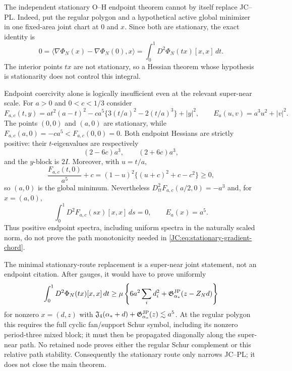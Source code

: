 \begin{remark}
The independent stationary O--H endpoint theorem cannot by itself replace
JC--PL.  Indeed, put the regular polygon and a hypothetical active global
minimizer in one fixed-area joint chart at $0$ and $x$.  Since both are
stationary, the exact identity is
\begin{equation}\label{JC:eq:stationary-gradient-chord}
 0=\langle\nabla\Phi_N(x)-\nabla\Phi_N(0),x\rangle
 =\int_0^1D^2\Phi_N(tx)[x,x]\,dt.
\end{equation}
The interior points $tx$ are not stationary, so a Hessian theorem whose
hypothesis is stationarity does not control this integral.

Endpoint coercivity alone is logically insufficient even at the relevant
super-near scale.  For $a>0$ and $0<c<1/3$ consider
\[
 F_{a,c}(t,y)=a t^2(a-t)^2
 -ca^5\{3(t/a)^2-2(t/a)^3\}+|y|^2,
 \qquad E_a(u,v)=a^3u^2+|v|^2.
\]
The points $(0,0)$ and $(a,0)$ are stationary, while
$F_{a,c}(a,0)=-ca^5<F_{a,c}(0,0)=0$.  Both endpoint Hessians are strictly
positive: their $t$-eigenvalues are respectively
\[
 (2-6c)a^3,\qquad (2+6c)a^3,
\]
and the $y$-block is $2I$.  Moreover, with $u=t/a$,
\[
 \frac{F_{a,c}(t,0)}{a^5}+c
 =(1-u)^2\{(u+c)^2+c-c^2\}\ge0,
\]
so $(a,0)$ is the global minimum.  Nevertheless
$D_{tt}^2F_{a,c}(a/2,0)=-a^3$ and, for $x=(a,0)$,
\[
 \int_0^1D^2F_{a,c}(sx)[x,x]\,ds=0,
 \qquad E_a(x)=a^5.
\]
Thus positive endpoint spectra, including uniform spectra in the naturally
scaled norm, do not prove the path monotonicity needed in
\eqref{JC:eq:stationary-gradient-chord}.

The minimal stationary-route replacement is a super-near joint statement,
not an endpoint citation.  After gauges, it would have to prove uniformly
\begin{equation}\label{JC:eq:stationary-super-near-cut}
 \int_0^1D^2\Phi_N(tx)[x,x]\,dt
 \ge\mu\left\{6a^2\sum_i d_i^2
 +\mathfrak G^{\rm JP}_{\alpha_*}(z-Z_Nd)\right\}
\end{equation}
for nonzero $x=(d,z)$ with
$\mathfrak J_4(\alpha_*+d)+\mathfrak G^{\rm JP}_{\alpha_*}(z)\lesssim a^5$.
At the regular polygon this requires the full cyclic fan/support Schur
symbol, including its nonzero period-three mixed block; it must then be
propagated diagonally along the super-near path.  No retained node proves
either the regular Schur complement or this relative path stability.
Consequently the stationary route only narrows JC--PL; it does not close
the main theorem.
\end{remark}

